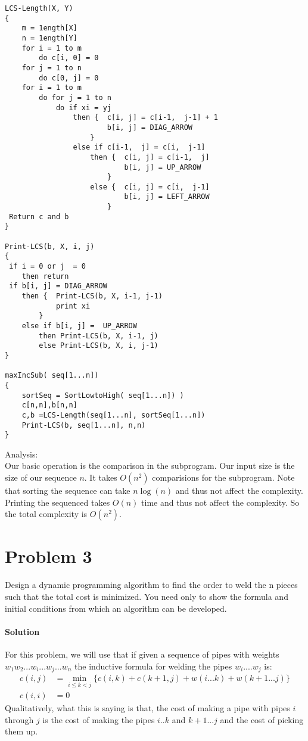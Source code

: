 \documentclass[12pt]{article}
\begin{document}
\begin{lstlisting}
LCS-Length(X, Y)
{
	m = 1ength[X] 
	n = 1ength[Y] 
	for i = 1 to m
		do c[i, 0] = 0
	for j = 1 to n
		do c[0, j] = 0
	for i = 1 to m
		do for j = 1 to n
			do if xi = yj 
				then { 	c[i, j] = c[i-1,  j-1] + 1
						b[i, j] = DIAG_ARROW
					}
				else if c[i-1,  j] = c[i,  j-1]
					then { 	c[i, j] = c[i-1,  j]
							b[i, j] = UP_ARROW
						}
					else { 	c[i, j] = c[i,  j-1]
							b[i, j] = LEFT_ARROW
						}
 Return c and b
}

Print-LCS(b, X, i, j)
{
 if i = 0 or j  = 0
  	then return
 if b[i, j] = DIAG_ARROW
  	then { 	Print-LCS(b, X, i-1, j-1)
  			print xi 
  		}
  	else if b[i, j] =  UP_ARROW
  		then Print-LCS(b, X, i-1, j)
  		else Print-LCS(b, X, i, j-1)
}

maxIncSub( seq[1...n]) 
{
	sortSeq = SortLowtoHigh( seq[1...n]) )
	c[n,n],b[n,n]
	c,b =LCS-Length(seq[1...n], sortSeq[1...n])
	Print-LCS(b, seq[1...n], n,n)
}
\end{lstlisting}
 
Analysis:\\
Our basic operation is the comparison in the subprogram.  Our input size is the size of our sequence $n$.  It takes $O(n^2)$ comparisions for the subprogram.  Note that sorting the sequence can take $n\log(n)$ and thus not affect the complexity.  Printing the sequenced takes $O(n)$ time and thus not affect the  complexity.  So the total complexity is $O(n^2)$.

\section{Problem 3}
Design a dynamic programming algorithm to find the order to weld the n pieces such that the total cost is minimized. You need only to show the formula and initial conditions from which an algorithm can be developed.

\paragraph{Solution}
For this problem, we will use that if given a sequence of pipes with weights $w_1w_2...w_i...w_j...w_n$ the inductive formula for welding the pipes $w_i .... w_j$ is:
\begin{align*}
c(i,j) & = \min_{ i\leq k <j} \{ c(i,k) + c(k+1,j) + w(i...k) + w(k+1...j)\} \\
c(i,i) & = 0
\end{align*}
Qualitatively, what this is saying is that, the cost of making a pipe with pipes $i$ through $j$ is the cost of making the pipes $i..k$ and $k+1...j$ and the cost of picking them up.\\
\end{document}
